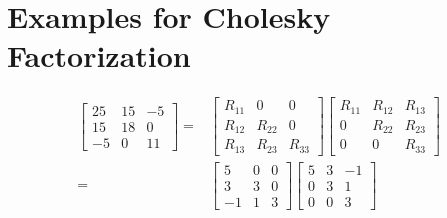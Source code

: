 \section{Examples for Cholesky Factorization}

\begin{example}
    \begin{equation} \begin{aligned}\left[\begin{array}{rrr}25 & 15 & -5 \\ 15 & 18 & 0 \\ -5 & 0 & 11\end{array}\right]=&\left[\begin{array}{ccc}R_{11} & 0 & 0 \\ R_{12} & R_{22} & 0 \\ R_{13} & R_{23} & R_{33}\end{array}\right]\left[\begin{array}{ccc}R_{11} & R_{12} & R_{13} \\ 0 & R_{22} & R_{23} \\ 0 & 0 & R_{33}\end{array}\right] \\=&\left[\begin{array}{rrr}5 & 0 & 0 \\ 3 & 3 & 0 \\ -1 & 1 & 3\end{array}\right]\left[\begin{array}{rrr}5 & 3 & -1 \\ 0 & 3 & 1 \\ 0 & 0 & 3\end{array}\right] \end{aligned} \end{equation}


\end{example}
